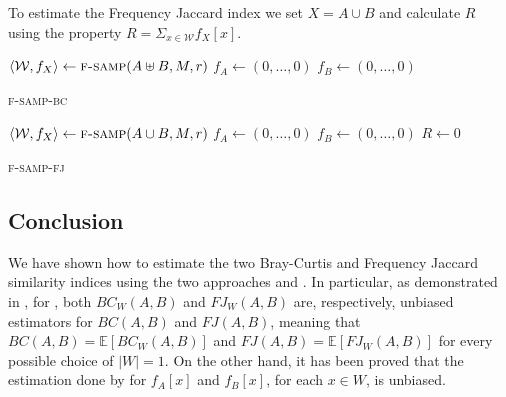 To estimate the Frequency Jaccard index we set $X = A \cup B$ and calculate $R$ using the property $R = \Sigma_{x \in \mathcal{W}}{f_X[x]}$.

\clearpage

\begin{algorithm}[h]
	\small
	\DontPrintSemicolon
	$\langle \mathcal{W}, f_X \rangle \gets \textsc{f-samp}(A \uplus B, M, r)$ \;
	$f_A \gets (0,\ldots,0)$\;
	$f_B \gets (0,\ldots,0)$\;
	\caption{\textsc{f-samp-bc}}
	\label{alg:f-samp-bc}
\end{algorithm}

\begin{algorithm}[h]
	\small
	\DontPrintSemicolon
	$\langle \mathcal{W}, f_X \rangle \gets \textsc{f-samp}(A \cup B, M, r)$ \;
	$f_A \gets (0,\ldots,0)$\;
	$f_B \gets (0,\ldots,0)$\;
	$R \gets 0$\;
	\caption{\textsc{f-samp-fj}}
	\label{alg:f-samp-fj}
\end{algorithm}

\subsection*{Conclusion}
We have shown how to estimate the two Bray-Curtis and Frequency Jaccard similarity indices using the two approaches \fcount and \fsamp. In particular, as demonstrated in \cite{SubSim}, for \fcount, both $BC_{W}(A,B)$ and $FJ_{W}(A,B)$ are, respectively, unbiased estimators for $BC(A,B)$ and $FJ(A,B)$, meaning that $BC(A,B) = \mathbb{E}[BC_{W}(A,B)]$ and $FJ(A,B) = \mathbb{E}[FJ_{W}(A,B)]$ for every possible choice of $|W| = 1$. On the other hand, it has been proved that the estimation done by \fsamp for $f_A[x]$ and $f_B[x]$, for each $x\in W$, is unbiased.

